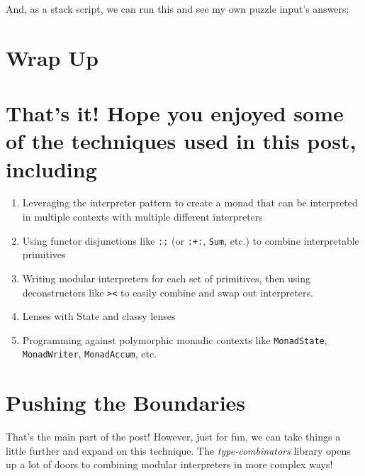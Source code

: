 \documentclass[]{article}
\newenvironment{Shaded}{}{}
\newcommand{\ExtensionTok}[1]{#1}
\newcommand{\NormalTok}[1]{#1}
\begin{document}
And, as a stack script, we can run this and see my own puzzle input's answers:

\begin{Shaded}
\end{Shaded}

\hypertarget{wrap-up}{%
\section{Wrap Up}\label{wrap-up}}

\hypertarget{thats-it-hope-you-enjoyed-some-of-the-techniques-used-in-this-post-including}{%
\section{That's it! Hope you enjoyed some of the techniques used in this post,
including}\label{thats-it-hope-you-enjoyed-some-of-the-techniques-used-in-this-post-including}}

\begin{enumerate}
\def\labelenumi{\arabic{enumi}.}
\tightlist
\item
  Leveraging the interpreter pattern to create a monad that can be interpreted
  in multiple contexts with multiple different interpreters
\item
  Using functor disjunctions like \texttt{:\textbar{}:} (or \texttt{:+:},
  \texttt{Sum}, etc.) to combine interpretable primitives
\item
  Writing modular interpreters for each set of primitives, then using
  deconstructors like \texttt{\textgreater{}\textbar{}\textless{}} to easily
  combine and swap out interpreters.
\item
  Lenses with State and classy lenses
\item
  Programming against polymorphic monadic contexts like \texttt{MonadState},
  \texttt{MonadWriter}, \texttt{MonadAccum}, etc.
\end{enumerate}

\hypertarget{pushing-the-boundaries}{%
\section{Pushing the Boundaries}\label{pushing-the-boundaries}}

That's the main part of the post! However, just for fun, we can take things a
little further and expand on this technique. The \emph{type-combinators} library
opens up a lot of doors to combining modular interpreters in more complex ways!
\end{document}
